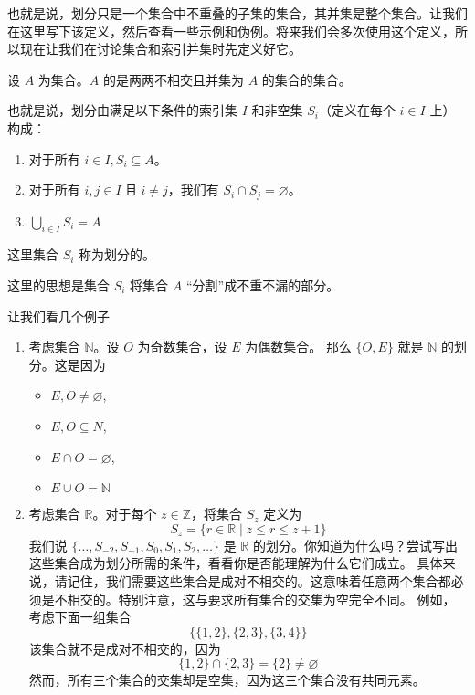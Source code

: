 也就是说，划分只是一个集合中不重叠的子集的集合，其并集是整个集合。让我们在这里写下该定义，然后查看一些示例和伪例。将来我们会多次使用这个定义，所以现在让我们在讨论集合和索引并集时先定义好它。

\begin{definition}\label{def:definition3.6.9}
    设 $A$ 为集合。$A$ 的是两两不相交且并集为 $A$ 的集合的集合。

    也就是说，划分由满足以下条件的索引集 $I$ 和非空集 $S_i$（定义在每个 $i \in I$ 上）构成：
    \begin{enumerate}[label=(\arabic*)]
        \item 对于所有 $i \in I, S_i \subseteq A$。
        \item 对于所有 $i, j \in I \;\text{且}\; i \ne j$，我们有 $S_i \cap S_j = \varnothing$。
        \item $\bigcup_{i \in I} S_i = A$
    \end{enumerate}
    这里集合 $S_i$ 称为划分的。
\end{definition}

这里的思想是集合 $S_i$ 将集合 $A$ ``分割''成不重不漏的部分。\\

\begin{example}
    让我们看几个例子
    \begin{enumerate}[label=(\arabic*)]
        \item 考虑集合 $\mathbb{N}$。设 $O$ 为奇数集合，设 $E$ 为偶数集合。 那么 $\{O, E\}$ 就是 $\mathbb{N}$ 的划分。这是因为
        \begin{itemize}
            \item $E, O \ne \varnothing$,
            \item $E, O \subseteq N$,
            \item $E \cap O = \varnothing$,
            \item $E \cup O = \mathbb{N}$ 
        \end{itemize}
        \item 考虑集合 $\mathbb{R}$。对于每个 $z \in \mathbb{Z}$，将集合 $S_z$ 定义为
        \[S_z = \{r \in \mathbb{R} \mid z \le r \le z + 1\}\]
        我们说 $\{\dots, S_{-2}, S_{-1}, S_0, S_1, S_2, \dots \}$ 是 $\mathbb{R}$ 的划分。你知道为什么吗？尝试写出这些集合成为划分所需的条件，看看你是否能理解为什么它们成立。
        具体来说，请记住，我们需要这些集合是成对不相交的。这意味着任意两个集合都必须是不相交的。特别注意，这与要求所有集合的交集为空完全不同。
        例如，考虑下面一组集合
        \[\big\{\{1, 2\}, \{2, 3\}, \{3, 4\}\big\}\]
        该集合就不是成对不相交的，因为
        \[\{1, 2\} \cap \{2, 3\} = \{2\} \ne \varnothing\]
        然而，所有三个集合的交集却是空集，因为这三个集合没有共同元素。
    \end{enumerate}
\end{example}

